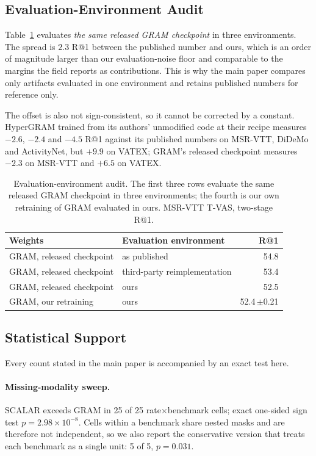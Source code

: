 \documentclass[10pt,twocolumn,letterpaper]{article}
\newcommand{\ours}{SCALAR}
\begin{document}
\subsection{Evaluation-Environment Audit}
\label{sec:envaudit}

Table~\ref{tab:envaudit} evaluates \emph{the same released GRAM checkpoint} in
three environments. The spread is $2.3$ R@1 between the published number and
ours, which is an order of magnitude larger than our evaluation-noise floor and
comparable to the margins the field reports as contributions. This is why the
main paper compares only artifacts evaluated in one environment and retains
published numbers for reference only.

The offset is also not sign-consistent, so it cannot be corrected by a constant.
HyperGRAM trained from its authors' unmodified code at their recipe measures
$-2.6$, $-2.4$ and $-4.5$ R@1 against its published numbers on MSR-VTT, DiDeMo
and ActivityNet, but $+9.9$ on VATEX; GRAM's released checkpoint measures
$-2.3$ on MSR-VTT and $+6.5$ on VATEX.

\begin{table}[t]
\centering
\caption{Evaluation-environment audit. The first three rows evaluate the same
released GRAM checkpoint in three environments; the fourth is our own retraining
of GRAM evaluated in ours. MSR-VTT T-VAS, two-stage R@1.}
\label{tab:envaudit}
\small
\begin{tabular}{llr}
\toprule
Weights & Evaluation environment & R@1 \\
\midrule
GRAM, released checkpoint & as published & 54.8 \\
GRAM, released checkpoint & third-party reimplementation & 53.4 \\
GRAM, released checkpoint & ours & 52.5 \\
GRAM, our retraining & ours & 52.4\,\tiny{$\pm$0.21} \\
\bottomrule
\end{tabular}
\end{table}

\subsection{Statistical Support}
\label{sec:stats}

Every count stated in the main paper is accompanied by an exact test here.

\paragraph{Missing-modality sweep.}
\ours{} exceeds GRAM in 25 of 25 rate$\times$benchmark cells; exact one-sided
sign test $p = 2.98\times10^{-8}$. Cells within a benchmark share nested masks
and are therefore not independent, so we also report the conservative version
that treats each benchmark as a single unit: 5 of 5, $p = 0.031$.
\end{document}
